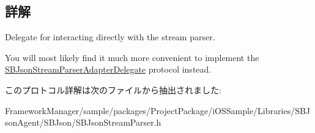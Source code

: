 \subsection{詳解}
Delegate for interacting directly with the stream parser. 

You will most likely find it much more convenient to implement the \hyperlink{protocol_s_b_json_stream_parser_adapter_delegate-p}{S\+B\+Json\+Stream\+Parser\+Adapter\+Delegate} protocol instead. 

このプロトコル詳解は次のファイルから抽出されました\+:\begin{DoxyCompactItemize}
\item 
Framework\+Manager/sample/packages/\+Project\+Package/i\+O\+S\+Sample/\+Libraries/\+S\+B\+Json\+Agent/\+S\+B\+Json/S\+B\+Json\+Stream\+Parser.\+h\end{DoxyCompactItemize}
